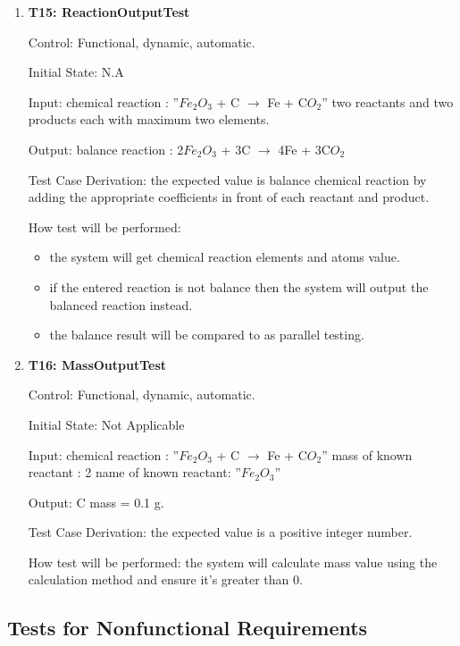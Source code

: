 \documentclass[12pt, titlepage]{article}
\begin{document}
\begin{enumerate}

\item{\bf T15: ReactionOutputTest\\}

Control: Functional, dynamic, automatic.
					
Initial State: N.A
					
Input: 
chemical reaction : ”$Fe_2$$O_3$ + C $\rightarrow$ Fe + C$O_2$”
two reactants and two products each with maximum two elements.
	
Output: balance reaction : 2$Fe_2$$O_3$ + 3C $\rightarrow$ 4Fe + 3C$O_2$

Test Case Derivation: the expected value is balance chemical reaction by adding the appropriate coefficients in front of each reactant and product.

How test will be performed: 
\begin{itemize}
\item the system will get chemical reaction elements and atoms value. 
\item if the entered reaction is not balance then the system will output the balanced reaction instead. 
\item the balance result will be compared to \cite{OnlineBalancer} as parallel testing.
\end{itemize}


\item{\bf T16: MassOutputTest\\}

Control: Functional, dynamic, automatic.
					
Initial State: Not Applicable
					
Input:
\newline
chemical reaction : ”$Fe_2$$O_3$ + C $\rightarrow$ Fe + C$O_2$”
\newline
mass of known reactant : 2
\newline
name of known reactant: ”$Fe_2$$O_3$”
				
Output: C mass = 0.1 g. 

Test Case Derivation: the expected value is a positive integer number. 
					
How test will be performed: 
the system will calculate mass value using the calculation method and ensure it's greater than 0.
 
\end{enumerate}	


\subsection{Tests for Nonfunctional Requirements}
\end{document}

